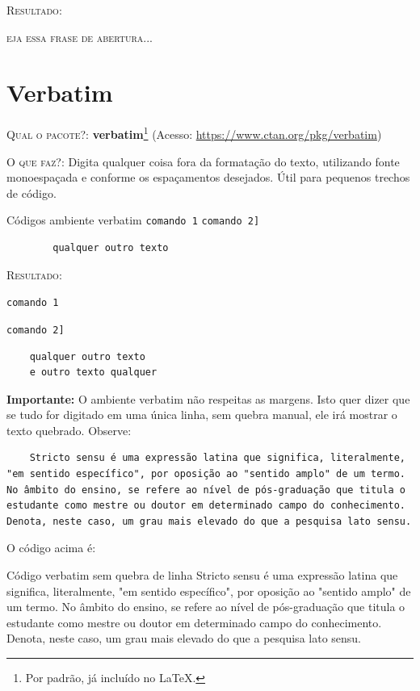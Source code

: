 \documentclass[a4paper,12pt,oneside,openright,extrafontsizes,openbib]{memoir}
\begin{document}
{\textsc{Resultado}:

\lettrine[findent=2pt]{}{eja essa frase de abertura...} \lipsum[1]
 
\chapter{Verbatim}

\textsc{Qual o pacote?}: \textbf{verbatim}\footnote{Por padrão, já incluído no \LaTeX.} (Acesso: \url{https://www.ctan.org/pkg/verbatim})

\textsc{O que faz?}: Digita qualquer coisa fora da formatação do texto, utilizando fonte monoespaçada e conforme os espaçamentos desejados. Útil para pequenos trechos de código.

\begin{codex}{Códigos ambiente verbatim}
	\verb|comando 1|
	\verb*|comando 2]|
	\begin{verbatim}
		qualquer outro texto
	\end{verbatim}
\end{codex}

\textsc{Resultado}:

\verb|comando 1|

\verb*|comando 2]|

\begin{verbatim}
	qualquer outro texto
	e outro texto qualquer
\end{verbatim}

\textbf{Importante:} O ambiente verbatim não respeitas as margens. Isto quer dizer que se tudo for digitado em uma única linha, sem quebra manual, ele irá mostrar o texto quebrado. Observe:

\begin{verbatim}
	Stricto sensu é uma expressão latina que significa, literalmente, "em sentido específico", por oposição ao "sentido amplo" de um termo. No âmbito do ensino, se refere ao nível de pós-graduação que titula o estudante como mestre ou doutor em determinado campo do conhecimento. Denota, neste caso, um grau mais elevado do que a pesquisa lato sensu.
\end{verbatim}

O código acima é:

\begin{codex}{Código verbatim sem quebra de linha}
	Stricto sensu é uma expressão latina que significa, literalmente, "em sentido específico", por oposição ao "sentido amplo" de um termo. No âmbito do ensino, se refere ao nível de pós-graduação que titula o estudante como mestre ou doutor em determinado campo do conhecimento. Denota, neste caso, um grau mais elevado do que a pesquisa lato sensu.
\end{codex}
}
\end{document}
